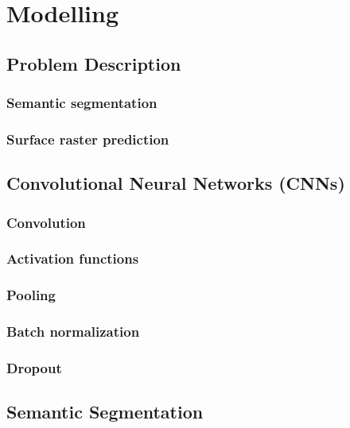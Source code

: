 \chapter{Modelling}


\section{Problem Description}%
\label{sec:segmentation-description}
\subsection{Semantic segmentation}

\subsection{Surface raster prediction}


\section{Convolutional Neural Networks (CNNs)}%
\label{sec:cnn}

\subsection{Convolution}

\subsection{Activation functions}

\subsection{Pooling}

\subsection{Batch normalization}

\subsection{Dropout}



\section{Semantic Segmentation}%
\label{sec:semantic-segmentation}

